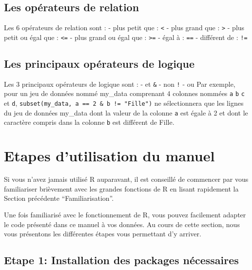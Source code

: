 \documentclass[
]{book}
\begin{document}
\hypertarget{les-opuxe9rateurs-de-relation}{%
\section{Les opérateurs de relation}\label{les-opuxe9rateurs-de-relation}}

Les 6 opérateurs de relation sont :
- plus petit que : \texttt{\textless{}}
- plus grand que : \texttt{\textgreater{}}
- plus petit ou égal que : \texttt{\textless{}=}
- plus grand ou égal que : \texttt{\textgreater{}=}
- égal à : \texttt{==}
- différent de : \texttt{!=}

\hypertarget{les-principaux-opuxe9rateurs-de-logique}{%
\section{Les principaux opérateurs de logique}\label{les-principaux-opuxe9rateurs-de-logique}}

Les 3 principaux opérateurs de logique sont :
- et \texttt{\&}
- non \texttt{!}
- ou \texttt{\textbar{}}
Par exemple, pour un jeu de données nommé my\_data comprenant 4 colonnes nommées \texttt{a} \texttt{b} \texttt{c} et \texttt{d}, \texttt{subset(my\_data,\ a\ ==\ 2\ \&\ b\ !=\ "Fille")} ne sélectionnera que les lignes du jeu de données my\_data dont la valeur de la colonne \texttt{a} est égale à 2 et dont le caractère compris dans la colonne \texttt{b} est différent de Fille.

\hypertarget{etapes-dutilisation-du-manuel}{%
\chapter{Etapes d'utilisation du manuel}\label{etapes-dutilisation-du-manuel}}

Si vous n'avez jamais utilisé R auparavant, il est conseillé de commencer par vous familiariser brièvement avec les grandes fonctions de R en lisant rapidement la Section précédente ``Familiarisation''.

Une fois familiarisé avec le fonctionnement de R, vous pouvez facilement adapter le code présenté dans ce manuel à vos données. Au cours de cette section, nous vous présentons les différentes étapes vous permettant d'y arriver.

\hypertarget{etape-1-installation-des-packages-nuxe9cessaires}{%
\section{Etape 1: Installation des packages nécessaires}\label{etape-1-installation-des-packages-nuxe9cessaires}}
\end{document}
